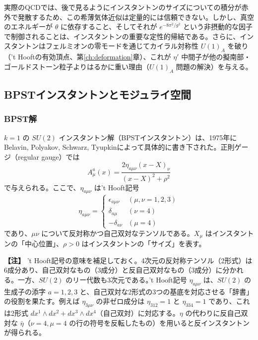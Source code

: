 \documentclass[uplatex, dvipdfmx, book]{jsbook}
\let\origsubsection\subsection
\let\origsubsubsection\subsubsection
\renewcommand{\section}{\origsubsection}
\renewcommand{\subsection}{\origsubsubsection}
\renewcommand{\subsubsection}{\paragraph}
\newenvironment{note}{\vspace{1ex}\par\footnotesize\noindent\textbf{【注】}}{\par\vspace{1ex}}
\begin{document}
実際のQCDでは、後で見るようにインスタントンのサイズについての積分が赤外で発散するため、この希薄気体近似は定量的には信頼できない。しかし、真空のエネルギーが $\theta$ に依存すること、そしてそれが $e^{-8\pi^2/g^2}$ という非摂動的な因子で制御されることは、インスタントンの重要な定性的帰結である。さらに、インスタントンはフェルミオンの零モードを通じてカイラル対称性 $U(1)_A$ を破り（'t Hooftの有効頂点、第\ref{ch:deformation}章）、これが $\eta'$ 中間子が他の擬南部・ゴールドストーン粒子よりはるかに重い理由（$U(1)_A$ 問題の解決）を与える\cite{thooft1976}。

\section{BPSTインスタントンとモジュライ空間}
\label{sec:bpst}

\subsection{BPST解}

$k=1$ の $SU(2)$ インスタントン解（BPSTインスタントン）は、1975年にBelavin, Polyakov, Schwarz, Tyupkinによって具体的に書き下された\cite{bpst1975}。正則ゲージ（regular gauge）では
\begin{equation}
    A_\mu^a(x) = \frac{2 \eta_{a\mu\nu} (x - X)_\nu}{(x - X)^2 + \rho^2}
    \label{eq:BPST}
\end{equation}
で与えられる。ここで、$\eta_{a\mu\nu}$ は't Hooft記号
\begin{equation}
    \eta_{a\mu\nu} = \begin{cases} \epsilon_{a\mu\nu} & (\mu, \nu = 1, 2, 3) \\ \delta_{a\mu} & (\nu = 4) \\ -\delta_{a\nu} & (\mu = 4) \end{cases}
\end{equation}
であり、$\mu\nu$ について反対称かつ自己双対なテンソルである。$X_\mu$ はインスタントンの「中心位置」、$\rho > 0$ はインスタントンの「サイズ」を表す。

\begin{note}
't Hooft記号の意味を補足しておく。4次元の反対称テンソル（2形式）は6成分あり、自己双対なもの（3成分）と反自己双対なもの（3成分）に分かれる。一方、$SU(2)$ のリー代数も3次元である。't Hooft記号 $\eta_{a\mu\nu}$ は、$SU(2)$ の生成子の添字 $a = 1, 2, 3$ と、自己双対な2形式の3つの基底を対応させる「辞書」の役割を果たす。例えば $\eta_{3\mu\nu}$ の非ゼロ成分は $\eta_{312} = 1$ と $\eta_{334} = 1$ であり、これは2形式 $dx^1 \wedge dx^2 + dx^3 \wedge dx^4$（自己双対）に対応する。$\eta$ の代わりに反自己双対な $\bar{\eta}$（$\nu = 4, \mu = 4$ の行の符号を反転したもの）を用いると反インスタントンが得られる。
\end{note}
\end{document}
